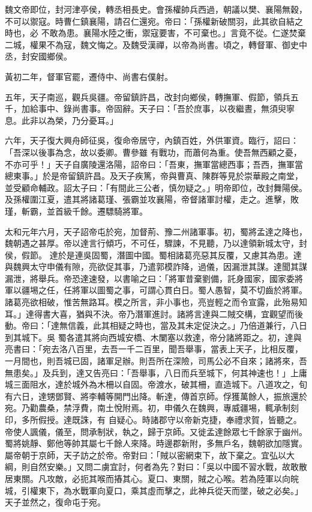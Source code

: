 \begin{pinyinscope}
 魏文帝即位，封河津亭侯，轉丞相長史。會孫權帥兵西過，朝議以樊、襄陽無穀，不可以禦寇。時曹仁鎮襄陽，請召仁還宛。帝曰：「孫權新破關羽，此其欲自結之時也，必
 不敢為患。襄陽水陸之衝，禦寇要害，不可棄也。」言竟不從。仁遂焚棄二城，權果不為寇，魏文悔之。及魏受漢禪，以帝為尚書。頃之，轉督軍、御史中丞，封安國鄉侯。



 黃初二年，督軍官罷，遷侍中、尚書右僕射。



 五年，天子南巡，觀兵吳疆。帝留鎮許昌，改封向鄉侯，轉撫軍、假節，領兵五千，加給事中、錄尚書事。帝固辭。天子曰：「吾於庶事，以夜繼晝，無須臾寧息。此非以為榮，乃分憂耳。」



 六年，天子復大興舟師征吳，復命帝居守，內鎮百姓，外供軍資。臨行，詔曰：「吾深以後事為念，故以委卿。曹參雖
 有戰功，而蕭何為重。使吾無西顧之憂，不亦可乎！」天子自廣陵還洛陽，詔帝曰：「吾東，撫軍當總西事；吾西，撫軍當總東事。」於是帝留鎮許昌。及天子疾篤，帝與曹真、陳群等見於崇華殿之南堂，並受顧命輔政。詔太子曰：「有間此三公者，慎勿疑之。」明帝即位，改封舞陽侯。及孫權圍江夏，遣其將諸葛瑾、張霸並攻襄陽，帝督諸軍討權，走之。進擊，敗瑾，斬霸，並首級千餘。遷驃騎將軍。



 太和元年六月，天子詔帝屯於宛，加督荊、豫二州諸軍事。初，蜀將孟達之降也，魏朝遇之甚厚。帝以達言行傾巧，不可任，驟諫，不見聽，乃以達領新城太守，封侯，假節。
 達於是連吳固蜀，潛圖中國。蜀相諸葛亮惡其反覆，又慮其為患。達與魏興太守申儀有隙，亮欲促其事，乃遣郭模詐降，過儀，因漏泄其謀。達聞其謀漏泄，將舉兵。帝恐達速發，以書喻之曰：「將軍昔棄劉備，託身國家，國家委將軍以疆埸之任，任將軍以圖蜀之事，可謂心貫白日。蜀人愚智，莫不切齒於將軍。諸葛亮欲相破，惟苦無路耳。模之所言，非小事也，亮豈輕之而令宣露，此殆易知耳。」達得書大喜，猶與不決。帝乃潛軍進討。諸將言達與二賊交構，宜觀望而後動。帝曰：「達無信義，此其相疑之時也，當及其未定促決之。」乃倍道兼行，八日到其城下。吳
 蜀各遣其將向西城安橋、木闌塞以救達，帝分諸將距之。初，達與亮書曰：「宛去洛八百里，去吾一千二百里，聞吾舉事，當表上天子，比相反覆，一月間也，則吾城已固，諸軍足辦。則吾所在深險，司馬公必不自來；諸將來，吾無患矣。」及兵到，達又告亮曰：「吾舉事，八日而兵至城下，何其神速也！」上庸城三面阻水，達於城外為木柵以自固。帝渡水，破其柵，直造城下。八道攻之，旬有六日，達甥鄧賢、將李輔等開門出降。斬達，傳首京師。俘獲萬餘人，振旅還於宛。乃勸農桑，禁浮費，南土悅附焉。初，申儀久在魏興，專威疆埸，輒承制刻印，多所假授。達既誅，有
 自疑心。時諸郡守以帝新克捷，奉禮求賀，皆聽之。帝使人諷儀，儀至，問承制狀，執之，歸于京師。又徙孟達餘眾七千餘家于幽州。蜀將姚靜、鄭他等帥其屬七千餘人來降。時邊郡新附，多無戶名，魏朝欲加隱實。屬帝朝于京師，天子訪之於帝。帝對曰：「賊以密網束下，故下棄之。宜弘以大綱，則自然安樂。」又問二虜宜討，何者為先？對曰：「吳以中國不習水戰，故敢散居東關。凡攻敵，必扼其喉而摏其心。夏口、東關，賊之心喉。若為陸軍以向皖城，引權東下，為水戰軍向夏口，乘其虛而擊之，此神兵從天而墜，破之必矣。」天子並然之，復命屯于宛。




\end{pinyinscope}
